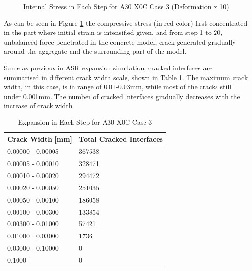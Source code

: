 \begin{figure}[ht!]
      

  \caption{Internal Stress in Each Step for A30 X0C Case 3 (Deformation x 10)}
  \label{fig:DEF_A30X0C_3_IS}
  \end{figure}

As can be seen in Figure \ref{fig:DEF_A30X0C_3_IS} the compressive stress (in red color) first concentrated in the part where initial strain is intensified given, and from step 1 to 20, unbalanced force penetrated in the concrete model, crack generated gradually around the aggregate and the surrounding part of the model.

Same as previous in ASR expansion simulation,  cracked interfaces are summarised in different crack width scale, shown in Table \ref{table:A30X0C_3_Cracks}. The maximum crack width, in this case, is in range of 0.01-0.03mm, while most of the cracks still under 0.001mm. The number of cracked interfaces gradually decreases with the increase of crack width.

\begin{table}[!h]
\centering
\begin{tabular}{ |p{4cm}|p{5cm}| }
\hline
 Crack Width [mm] &  Total Cracked Interfaces \\
 \hline\hline

   0.00000 - 0.00005 & 367538 \\
   0.00005 - 0.00010 & 328471 \\
   0.00010 - 0.00020 & 294472 \\
   0.00020 - 0.00050 & 251035 \\
   0.00050 - 0.00100 & 186058 \\
   0.00100 - 0.00300 & 133854 \\
   0.00300 - 0.01000 & 57421 \\
   0.01000 - 0.03000 & 1736 \\
   0.03000 - 0.10000 & 0 \\
   0.1000+ & 0 \\

  \hline
  \end{tabular}
\caption{Expansion in Each Step for A30 X0C Case 3}
\label{table:A30X0C_3_Cracks}
\end{table}
